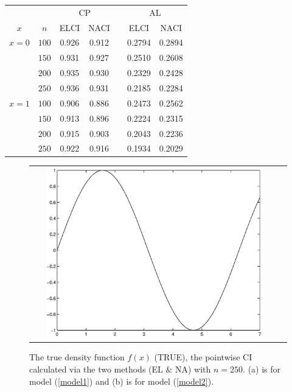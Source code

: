 \documentclass[12pt]{article}
\renewcommand{\baselinestretch}{1.25}
\def\vv{1.3}
\begin{document}
\begin{center}
\begin{tabular}{ccccccc}
\hline  &   & \multicolumn{2}{c}{CP}
     &&\multicolumn{2}{c}{AL}\\
\cline{3-4} \cline{6-7}
$x$ & $n$ &  ELCI   & NACI   && ELCI  & NACI  \\
\cline{3-4} \cline{6-7}
 $x=0$ & $100$  & 0.926  & 0.912 & &  0.2794& 0.2894 \\
          & $150$  &  0.931 & 0.927 & & 0.2510 & 0.2608 \\
          & $200$  &  0.935  & 0.930 & & 0.2329& 0.2428 \\
          & $250$  &  0.936 & 0.931  & & 0.2185& 0.2284\\
$x=1$ & $100$  & 0.906  & 0.886 & &  0.2473& 0.2562 \\
          & $150$  &  0.913 & 0.896& & 0.2224 & 0.2315 \\
          & $200$  &  0.915  & 0.903 & & 0.2043& 0.2236 \\
          & $250$  &  0.922 & 0.916  & & 0.1934& 0.2029\\
 \hline
\end{tabular}
\end{center}


\renewcommand{\baselinestretch}{\vv}

\begin{figure}[htbp]
\begin{tabular}{cc}
\includegraphics[width=0.90\textwidth]{fig1.eps}  %
\end{tabular}
\caption{ The true density function $f(x)$ (TRUE),
the pointwise CI calculated via the two methods (EL \& NA) with $n=250$. (a) is for model (\ref{model1}) and (b) is for model (\ref{model2}).   }
    \label{fig1}
\end{figure}
\end{document}
